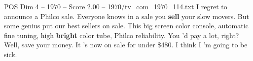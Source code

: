 \begin{textsample}{POS Dim 4 – 1970 – Score 2.00 – 1970/tv\_com\_1970\_114.txt}  \label{ex:f4_pos_031}
I regret to announce a Philco sale.
Everyone knows in a sale you \textbf{sell} your slow movers.
But some genius put our best sellers on sale.
This big screen color console, automatic fine tuning, high \textbf{bright} color tube, Philco reliability.
You 'd pay a lot, right?
Well, save your money.
It 's now on sale for under \$480.
I think I 'm going to be sick.

\end{textsample}
